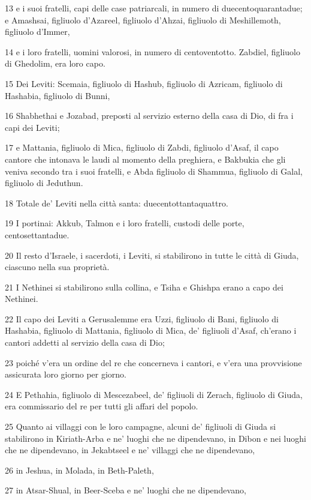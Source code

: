 \par 13 e i suoi fratelli, capi delle case patriarcali, in numero di duecentoquarantadue; e Amashsai, figliuolo d'Azareel, figliuolo d'Ahzai, figliuolo di Meshillemoth, figliuolo d'Immer,
\par 14 e i loro fratelli, uomini valorosi, in numero di centoventotto. Zabdiel, figliuolo di Ghedolim, era loro capo.
\par 15 Dei Leviti: Scemaia, figliuolo di Hashub, figliuolo di Azricam, figliuolo di Hashabia, figliuolo di Bunni,
\par 16 Shabhethai e Jozabad, preposti al servizio esterno della casa di Dio, di fra i capi dei Leviti;
\par 17 e Mattania, figliuolo di Mica, figliuolo di Zabdi, figliuolo d'Asaf, il capo cantore che intonava le laudi al momento della preghiera, e Bakbukia che gli veniva secondo tra i suoi fratelli, e Abda figliuolo di Shammua, figliuolo di Galal, figliuolo di Jeduthun.
\par 18 Totale de' Leviti nella città santa: duecentottantaquattro.
\par 19 I portinai: Akkub, Talmon e i loro fratelli, custodi delle porte, centosettantadue.
\par 20 Il resto d'Israele, i sacerdoti, i Leviti, si stabilirono in tutte le città di Giuda, ciascuno nella sua proprietà.
\par 21 I Nethinei si stabilirono sulla collina, e Tsiha e Ghishpa erano a capo dei Nethinei.
\par 22 Il capo dei Leviti a Gerusalemme era Uzzi, figliuolo di Bani, figliuolo di Hashabia, figliuolo di Mattania, figliuolo di Mica, de' figliuoli d'Asaf, ch'erano i cantori addetti al servizio della casa di Dio;
\par 23 poiché v'era un ordine del re che concerneva i cantori, e v'era una provvisione assicurata loro giorno per giorno.
\par 24 E Pethahia, figliuolo di Mescezabeel, de' figliuoli di Zerach, figliuolo di Giuda, era commissario del re per tutti gli affari del popolo.
\par 25 Quanto ai villaggi con le loro campagne, alcuni de' figliuoli di Giuda si stabilirono in Kiriath-Arba e ne' luoghi che ne dipendevano, in Dibon e nei luoghi che ne dipendevano, in Jekabtseel e ne' villaggi che ne dipendevano,
\par 26 in Jeshua, in Molada, in Beth-Paleth,
\par 27 in Atsar-Shual, in Beer-Sceba e ne' luoghi che ne dipendevano,

